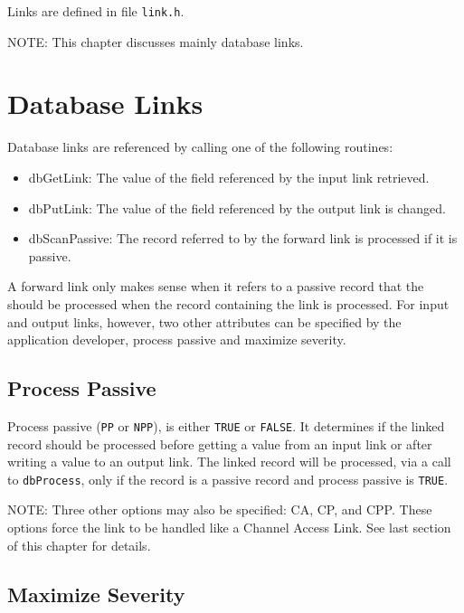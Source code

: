 Links are defined in file \verb|link.h|.

NOTE: This chapter discusses mainly database links.

\section{Database Links}

Database links are referenced by calling one of the following routines:

\begin{itemize}\item {}dbGetLink: The value of the field referenced by the input link retrieved.

\item {}dbPutLink: The value of the field referenced by the output link is changed.

\item {}dbScanPassive: The record referred to by the forward link is processed if it is passive.

\end{itemize}A forward link only makes sense when it refers to a passive record that the should be processed when the record 
containing the link is processed. For input and output links, however, two other attributes can be specified by the 
application developer, process passive and maximize severity.

\subsection{Process Passive}

Process passive (\verb|PP| or \verb|NPP|), is either \verb|TRUE| or \verb|FALSE|.  It determines if the linked record should be processed before 
getting a value from an input link or after writing a value to an output link. The linked record will be processed, via a call 
to \verb|dbProcess|, only if the record is a passive record and process passive is \verb|TRUE|.

NOTE: Three other options may also be specified: CA, CP, and CPP. These options force the link to be handled like a 
Channel Access Link. See last section of this chapter for details.

\subsection{Maximize Severity}


